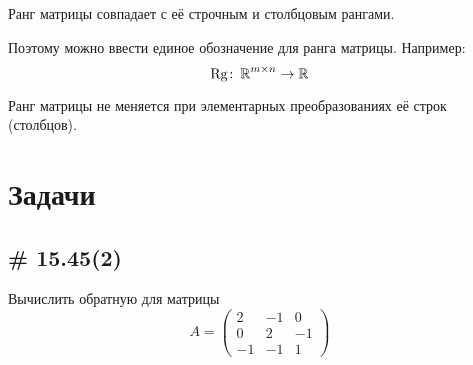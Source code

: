 \documentclass[a4paper,12pt]{article}
\begin{document}
    \begin{theorem}
      Ранг матрицы совпадает с её строчным и столбцовым рангами.
    \end{theorem}
    
    Поэтому можно ввести единое обозначение для ранга матрицы.
    Например:
    \[
      \Rg\colon \RR^{m\times n} \hm\to \RR
    \]
    
    \begin{remark}
      Ранг матрицы не меняется при элементарных преобразованиях её строк (столбцов).
    \end{remark}
  
  
  
  \section{Задачи}
  
  
  \subsection{\# 15.45(2)}
  
  Вычислить обратную для матрицы
  \[
    A = \begin{pmatrix}
      2 & -1 & 0\\
      0 & 2 & -1\\
      -1 & -1 & 1
    \end{pmatrix}
  \]
  
\end{document}
